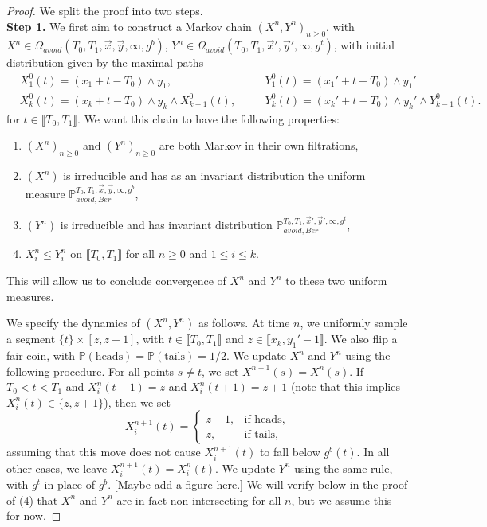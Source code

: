 \documentclass[12pt]{article}
\begin{document}
	\begin{proof} We split the proof into two steps.\\
	
	\textbf{Step 1.} We first aim to construct a Markov chain $(X^n,Y^n)_{n\geq 0}$, with \\$X^n\in \Omega_{avoid}(T_0,T_1,\vec{x},\vec{y},\infty,g^b)$, $Y^n\in \Omega_{avoid}(T_0,T_1,\vec{x}',\vec{y}',\infty,g^t)$, with initial distribution given by the maximal paths
	\begin{align*}
	& X^0_1(t)=(x_1+t-T_0) \wedge y_1,\quad && Y^0_1(t)=(x_1'+t-T_0) \wedge y_1'\\
	& X^0_k(t)=(x_k+t-T_0) \wedge y_k \wedge X^0_{k-1}(t), \quad && Y^0_k(t)=(x_k'+t-T_0) \wedge y_k' \wedge Y^0_{k-1}(t).
	\end{align*}
	for $t\in\llbracket T_0, T_1\rrbracket$. We want this chain to have the following properties: 
	\begin{enumerate}[label=(\arabic*)]
		
		\item $(X^n)_{n\geq 0}$ and $(Y^n)_{n\geq 0}$ are both Markov in their own filtrations,
		
		\item $(X^n)$ is irreducible and has as an invariant distribution the uniform measure $\mathbb{P}_{avoid,Ber}^{T_0,T_1,\vec{x},\vec{y},\infty,g^b}$,
		
		\item $(Y^n)$ is irreducible and has invariant distribution $\mathbb{P}_{avoid,Ber}^{T_0,T_1,\vec{x}',\vec{y}',\infty,g^t}$,
		
		\item $X^n_i\leq Y^n_i$ on $\llbracket T_0, T_1\rrbracket$ for all $n\geq 0$ and $1\leq i \leq k$.
		
	\end{enumerate}

	\noindent This will allow us to conclude convergence of $X^n$ and $Y^n$ to these two uniform measures.
	
	We specify the dynamics of $(X^n, Y^n)$ as follows. At time $n$, we uniformly sample a segment $\{t\}\times[z, z+1]$, with $t\in\llbracket T_0, T_1\rrbracket$ and $z\in\llbracket x_k,y_1'-1\rrbracket$. We also flip a fair coin, with $\mathbb{P}(\textrm{heads})=\mathbb{P}(\textrm{tails})=1/2$. We update $X^n$ and $Y^n$ using the following procedure. For all points $s\neq t$, we set $X^{n+1}(s) = X^n(s)$. If $T_0 < t < T_1$ and $X^n_i(t-1)=z$ and $X^n_i(t+1)=z+1$ (note that this implies $X^n_i(t)\in\{z,z+1\}$), then we set
	\[
	X^{n+1}_i(t) = \begin{cases}
		z+1, & \textrm{if heads},\\
		z, & \textrm{if tails},
	\end{cases}
	\]
	assuming that this move does not cause $X^{n+1}_i(t)$ to fall below $g^b(t)$. In all other cases, we leave $X^{n+1}_i(t)=X^n_i(t)$. We update $Y^n$ using the same rule, with $g^t$ in place of $g^b$. [Maybe add a figure here.] We will verify below in the proof of (4) that $X^n$ and $Y^n$ are in fact non-intersecting for all $n$, but we assume this for now.
	

\end{proof}
\end{document}
